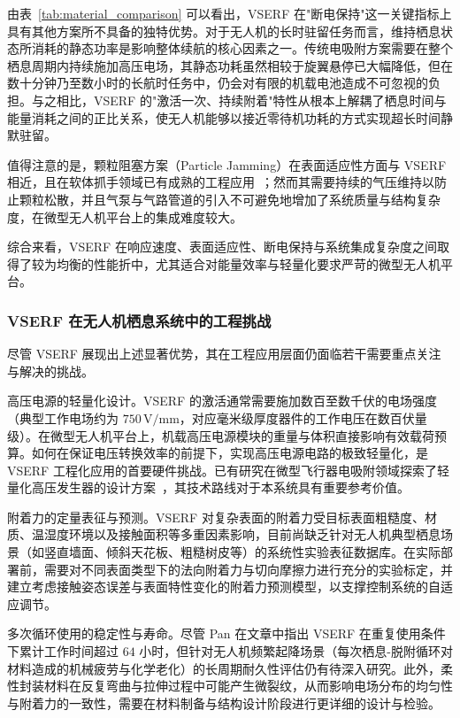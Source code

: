 由表~\ref{tab:material_comparison} 可以看出，VSERF 在"断电保持"这一关键指标上具有其他方案所不具备的独特优势。对于无人机的长时驻留任务而言，维持栖息状态所消耗的静态功率是影响整体续航的核心因素之一。传统电吸附方案需要在整个栖息周期内持续施加高压电场，其静态功耗虽然相较于旋翼悬停已大幅降低，但在数十分钟乃至数小时的长航时任务中，仍会对有限的机载电池造成不可忽视的负担。与之相比，VSERF 的"激活一次、持续附着"特性从根本上解耦了栖息时间与能量消耗之间的正比关系，使无人机能够以接近零待机功耗的方式实现超长时间静默驻留。
 
值得注意的是，颗粒阻塞方案（Particle Jamming）在表面适应性方面与 VSERF 相近，且在软体抓手领域已有成熟的工程应用~\cite{o2008review}；然而其需要持续的气压维持以防止颗粒松散，并且气泵与气路管道的引入不可避免地增加了系统质量与结构复杂度，在微型无人机平台上的集成难度较大。
 
 
综合来看，VSERF 在响应速度、表面适应性、断电保持与系统集成复杂度之间取得了较为均衡的性能折中，尤其适合对能量效率与轻量化要求严苛的微型无人机平台。
 
\subsubsection{VSERF 在无人机栖息系统中的工程挑战}
 
尽管 VSERF 展现出上述显著优势，其在工程应用层面仍面临若干需要重点关注与解决的挑战。
 
高压电源的轻量化设计。VSERF 的激活通常需要施加数百至数千伏的电场强度（典型工作电场约为 $750\,\text{V/mm}$，对应毫米级厚度器件的工作电压在数百伏量级）。在微型无人机平台上，机载高压电源模块的重量与体积直接影响有效载荷预算。如何在保证电压转换效率的前提下，实现高压电源电路的极致轻量化，是 VSERF 工程化应用的首要硬件挑战。已有研究在微型飞行器电吸附领域探索了轻量化高压发生器的设计方案~\cite{park2020lightweight}，其技术路线对于本系统具有重要参考价值。
 
附着力的定量表征与预测。VSERF 对复杂表面的附着力受目标表面粗糙度、材质、温湿度环境以及接触面积等多重因素影响，目前尚缺乏针对无人机典型栖息场景（如竖直墙面、倾斜天花板、粗糙树皮等）的系统性实验表征数据库。在实际部署前，需要对不同表面类型下的法向附着力与切向摩擦力进行充分的实验标定，并建立考虑接触姿态误差与表面特性变化的附着力预测模型，以支撑控制系统的自适应调节。
 
多次循环使用的稳定性与寿命。尽管 Pan 在文章中指出 VSERF 在重复使用条件下累计工作时间超过 $64$ 小时，但针对无人机频繁起降场景（每次栖息-脱附循环对材料造成的机械疲劳与化学老化）的长周期耐久性评估仍有待深入研究。此外，柔性封装材料在反复弯曲与拉伸过程中可能产生微裂纹，从而影响电场分布的均匀性与附着力的一致性，需要在材料制备与结构设计阶段进行更详细的设计与检验。
 

